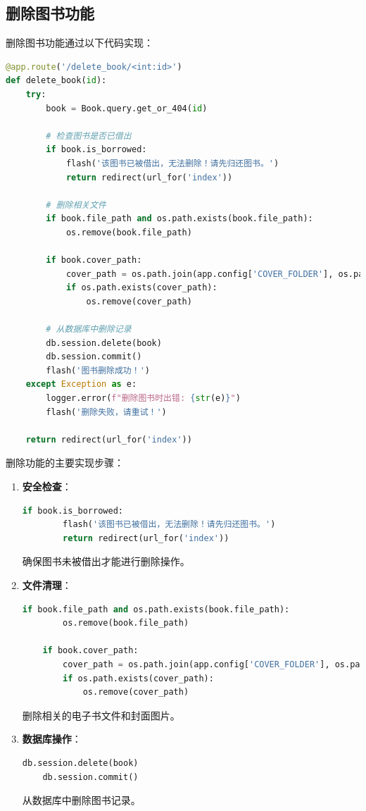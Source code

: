 \documentclass{SYSUReport}
\begin{document}
\subsection{删除图书功能}
删除图书功能通过以下代码实现：

\begin{lstlisting}[language=Python]
@app.route('/delete_book/<int:id>')
def delete_book(id):
    try:
        book = Book.query.get_or_404(id)
        
        # 检查图书是否已借出
        if book.is_borrowed:
            flash('该图书已被借出，无法删除！请先归还图书。')
            return redirect(url_for('index'))
        
        # 删除相关文件
        if book.file_path and os.path.exists(book.file_path):
            os.remove(book.file_path)
        
        if book.cover_path:
            cover_path = os.path.join(app.config['COVER_FOLDER'], os.path.basename(book.cover_path))
            if os.path.exists(cover_path):
                os.remove(cover_path)
        
        # 从数据库中删除记录
        db.session.delete(book)
        db.session.commit()
        flash('图书删除成功！')
    except Exception as e:
        logger.error(f"删除图书时出错: {str(e)}")
        flash('删除失败，请重试！')
    
    return redirect(url_for('index'))
\end{lstlisting}

删除功能的主要实现步骤：

\begin{enumerate}
    \item \textbf{安全检查}：
    \begin{lstlisting}[language=Python]
    if book.is_borrowed:
        flash('该图书已被借出，无法删除！请先归还图书。')
        return redirect(url_for('index'))
    \end{lstlisting}
    确保图书未被借出才能进行删除操作。
    
    \item \textbf{文件清理}：
    \begin{lstlisting}[language=Python]
    if book.file_path and os.path.exists(book.file_path):
        os.remove(book.file_path)
    
    if book.cover_path:
        cover_path = os.path.join(app.config['COVER_FOLDER'], os.path.basename(book.cover_path))
        if os.path.exists(cover_path):
            os.remove(cover_path)
    \end{lstlisting}
    删除相关的电子书文件和封面图片。
    
    \item \textbf{数据库操作}：
    \begin{lstlisting}[language=Python]
    db.session.delete(book)
    db.session.commit()
    \end{lstlisting}
    从数据库中删除图书记录。
\end{enumerate}
\end{document}
